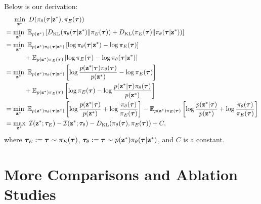 Below is our derivation: 
\begin{align}
	&\ \ \ \  \min_{\bz^*} \ D(\pi_\theta(\btau|\bz^*), \pi_E(\btau)) \nonumber \\
    &= \min_{\bz^*} \ \mathbb{E}_{p(\bz^*)} \lbr D_\text{KL}(\pi_\theta(\btau|\bz^*)\Vert \pi_E(\btau)) + D_\text{KL}(\pi_E(\btau) \Vert \pi_\theta(\btau|\bz^*)) \rbr 
	\nonumber \\
	&= \min_{\bz^*} \ \mathbb{E}_{p(\bz^*)\pi_\theta(\btau|\bz^*)}\left[\log \pi_\theta(\btau|\bz^*) - \log \pi_E(\btau)\right] \nonumber \\
	&\qquad\quad  + \mathbb{E}_{p(\bz^*)\pi_E(\btau)}\left[\log \pi_E(\btau) - \log \pi_\theta(\btau|\bz^*)\right]
	\nonumber \\
	&= \min_{\bz^*} \ \mathbb{E}_{p(\bz^*)\pi_\theta(\btau|\bz^*)}\left[\log \frac{p(\bz^*|\btau)\pi_\theta(\btau)}{p(\bz^*)} - \log \pi_E(\btau)\right] \nonumber \\
	&\qquad\quad  + \mathbb{E}_{p(\bz^*)\pi_E(\btau)}\left[\log \pi_E(\btau) - \log \frac{p(\bz^*|\btau)\pi_\theta(\btau)}{p(\bz^*)}\right]
	\nonumber \\
	&= \min_{\bz^*} \ \mathbb{E}_{p(\bz^*)\pi_\theta(\btau|\bz^*)}\left[\log \frac{p(\bz^*|\btau)}{p(\bz^*)} + \log \frac{\pi_\theta(\btau)}{\pi_E(\btau)}\right] 
	- \mathbb{E}_{p(\bz^*)\pi_E(\btau)}\left[\log \frac{p(\bz^*|\btau)}{p(\bz^*)}+\log \frac{\pi_\theta(\btau)}{\pi_E(\btau)}\right]
	\nonumber \\
	&= \max_{\bz^*} \ \mathcal{I}(\bz^*; \btau_E) - \mathcal{I}(\bz^*; \btau_\theta) 
	- D_{\text{KL}}(\pi_\theta(\btau), \pi_E(\btau)) + C,
	\nonumber 
\end{align}
where ${\bm{\tau}}_E := {\bm{\tau}} \sim \pi_E({\bm{\tau}})$, ${\bm{\tau}}_\theta := {\bm{\tau}} \sim p({\mathbf{z}}^*)\pi_\theta({\bm{\tau}}|{\mathbf{z}}^*)$, and $C$ is a constant.  %


\section{More Comparisons and Ablation Studies}


